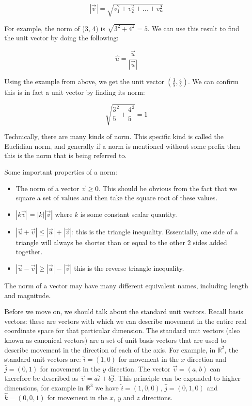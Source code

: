 \documentclass[a4paper,oneside]{report}
\begin{document}
\[ |\overrightarrow{v}| = \sqrt{v_1^2 + v_2^2 + \dots + v_n^2} \]

For example, the norm of (3, 4) is \( \sqrt{3^2 + 4^2} = 5 \). We can use this
result to find the unit vector by doing the following:

\[ \hat{u} = \frac{\overrightarrow{u}}{|\overrightarrow{u}|} \]

Using the example from above, we get the unit vector \( (\frac{3}{5},
\frac{4}{5}) \). We can confirm this is in fact a unit vector by finding its
norm:

\[ \sqrt{ \frac{3}{5}^2 + \frac{4}{5}^2 } = 1 \]

Technically, there are many kinds of norm. This specific kind is called the
Euclidian norm, and generally if a norm is mentioned without some prefix then
this is the norm that is being referred to.

Some important properties of a norm:

\begin{itemize}
	\item{The norm of a vector \( \overrightarrow{v} \geq 0 \). This
		should be obvious from the fact that we square a set of values
		and then take the square root of these values.}
	\item{\( |k\overrightarrow{v}| = |k||\overrightarrow{v}| \) where
		\( k \) is some constant scalar quantity.}
	\item{\( |\overrightarrow{u} + \overrightarrow{v}| \leq
		|\overrightarrow{u}| + |\overrightarrow{v}| \): this is
		the triangle inequality. Essentially, one side of a triangle
		will always be shorter than or equal to the other 2 sides
		added together.}
	\item{\( |\overrightarrow{u} - \overrightarrow{v}| \geq
		|\overrightarrow{u}| - |\overrightarrow{v}| \) this is
		the reverse triangle inequality.}
\end{itemize}

The norm of a vector may have many different equivalent names, including
length and magnitude.

Before we move on, we should talk about the standard unit vectors. Recall
basis vectors: these are vectors with which we can describe movement in the
entire real coordinate space for that particular dimension. The standard unit
vectors (also known as canonical vectors) are a set of unit basis vectors that
are used to describe movement in the direction of each of the axis. For
example, in \( \mathbb{R}^2 \), the standard unit vectors are: \( \hat{i} =
(1, 0) \) for movement in the \( x \) direction and \( \hat{j} = (0, 1) \) for
movement in the \( y \) direction. The vector \( \overrightarrow{v} =
(a, b) \) can therefore be described as \( \overrightarrow{v} = a\hat{i} +
b\hat{j} \). This principle can be expanded to higher dimensions, for example
in \( \mathbb{R}^3 \) we have \( \hat{i} = (1, 0, 0) \), \( \hat{j} =
(0, 1, 0) \) and \( \hat{k} = (0, 0, 1) \) for movement in the \( x \), \( y \)
and \( z \) directions.
\end{document}
